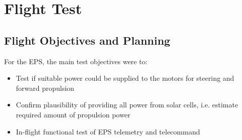\newpage
\chapter{Flight Test}
\label{chap:flight_test}

\section{Flight Objectives and Planning}

For the \ac{EPS}, the main test objectives were to: 
%
\begin{itemize}
\item Test if suitable power could be supplied to the motors for steering and forward propulsion
\item Confirm plausibility of providing all power from solar cells, i.e. estimate required amount of propulsion power
\item In-flight functional test of EPS telemetry and telecommand 
\end{itemize}
%
%
